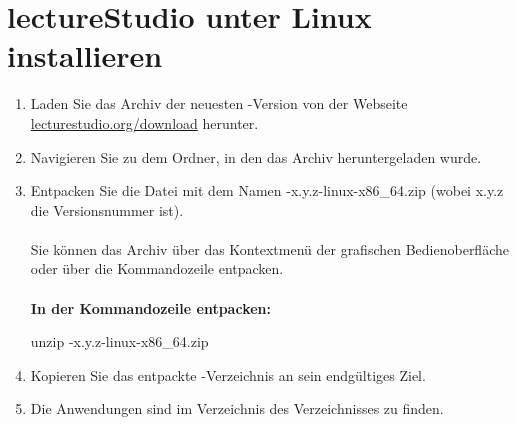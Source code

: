  \section{lectureStudio unter Linux installieren}
 \begin{enumerate}
	\item Laden Sie das Archiv der neuesten \lectStudio{}-Version von der Webseite \href{https://www.lecturestudio.org/download}{lecturestudio.org/download} herunter.
	\item Navigieren Sie zu dem Ordner, in den das Archiv heruntergeladen wurde.
	\item Entpacken Sie die Datei mit dem Namen \lectStudio{}-x.y.z-linux-x86\_64.zip (wobei x.y.z die Versionsnummer ist).
	\\\\
	Sie können das Archiv über das Kontextmenü der grafischen Bedienoberfläche oder über die Kommandozeile entpacken.
	\\\\
	\textbf{In der Kommandozeile entpacken:}
	\begin{command}
		unzip \lectStudio{}-x.y.z-linux-x86\_64.zip
	\end{command}
	\item Kopieren Sie das entpackte \lectStudio{}-Verzeichnis an sein endgültiges Ziel.
	\item Die Anwendungen sind im Verzeichnis  des \lectStudio{} Verzeichnisses zu finden.
\end{enumerate}

